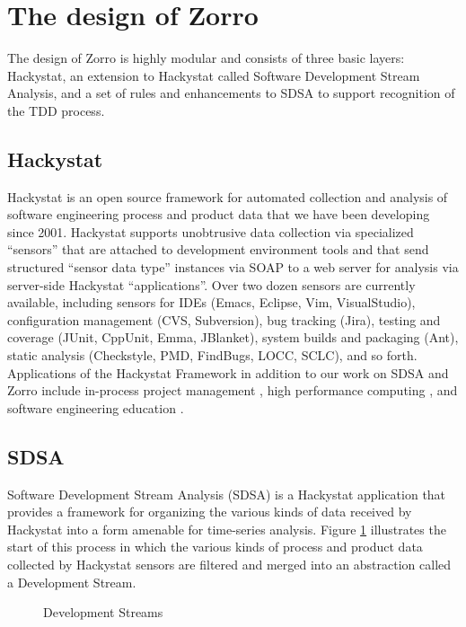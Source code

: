 \documentclass[runningheads]{llncs}
\begin{document}
\section{The design of Zorro}
\label{sec:sdsa}

The design of Zorro is highly modular and consists of three basic layers:
Hackystat, an extension to Hackystat called Software Development Stream Analysis,
and a set of rules and enhancements to SDSA to support recognition of the TDD process.

\subsection{Hackystat}

Hackystat is an open source framework for automated collection and analysis
of software engineering process and product data that we have been
developing since 2001. Hackystat supports unobtrusive data collection via
specialized ``sensors'' that are attached to development environment tools
and that send structured ``sensor data type'' instances via SOAP to a web
server for analysis via server-side Hackystat ``applications''. Over two
dozen sensors are currently available, including sensors for IDEs (Emacs,
Eclipse, Vim, VisualStudio), configuration management (CVS, Subversion),
bug tracking (Jira), testing and coverage (JUnit, CppUnit, Emma, JBlanket),
system builds and packaging (Ant), static analysis (Checkstyle, PMD,
FindBugs, LOCC, SCLC), and so forth.  Applications of the Hackystat
Framework in addition to our work on SDSA and Zorro include in-process project
management \cite{csdl2-04-11}, high performance computing
\cite{csdl2-04-22}, and software engineering education \cite{csdl2-03-12}.

\subsection{SDSA}

Software Development Stream Analysis (SDSA) is a Hackystat application that
provides a framework for organizing the various kinds of data received by
Hackystat into a form amenable for time-series analysis.  Figure
\ref{fig:Streaming} illustrates the start of this process in which the
various kinds of process and product data collected by Hackystat sensors
are filtered and merged into an abstraction called a Development Stream.

\begin{figure}[t]
  \centerline{}
  \caption{Development Streams}
  \label{fig:Streaming}
\end{figure} 
\end{document}
